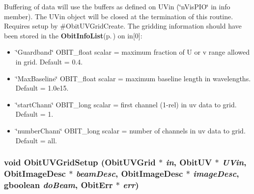Buffering of data will use the buffers as defined on UVin (\char`\"{}n\-Vis\-PIO\char`\"{} in info member). The UVin object will be closed at the termination of this routine. Requires setup by \#Obit\-UVGrid\-Create. The gridding information should have been stored in the {\bf Obit\-Info\-List}{\rm (p.\,\pageref{structObitInfoList})} on in[0]: \begin{itemize}
\item \char`\"{}Guardband\char`\"{} OBIT\_\-float scalar = maximum fraction of U or v range allowed in grid. Default = 0.4. \item \char`\"{}Max\-Baseline\char`\"{} OBIT\_\-float scalar = maximum baseline length in wavelengths. Default = 1.0e15. \item \char`\"{}start\-Chann\char`\"{} OBIT\_\-long scalar = first channel (1-rel) in uv data to grid. Default = 1. \item \char`\"{}number\-Chann\char`\"{} OBIT\_\-long scalar = number of channels in uv data to grid. Default = all. 
\end{itemize}
\subsubsection{\setlength{\rightskip}{0pt plus 5cm}void Obit\-UVGrid\-Setup ({\bf Obit\-UVGrid} $\ast$ {\em in}, {\bf Obit\-UV} $\ast$ {\em UVin}, {\bf Obit\-Image\-Desc} $\ast$ {\em beam\-Desc}, {\bf Obit\-Image\-Desc} $\ast$ {\em image\-Desc}, gboolean {\em do\-Beam}, {\bf Obit\-Err} $\ast$ {\em err})}\label{ObitUVGrid_8h_a11}


